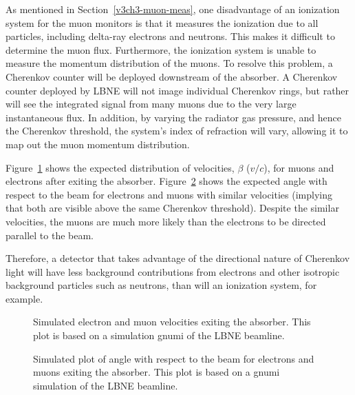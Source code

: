 As mentioned in Section~\ref{v3ch3-muon-meas}, one disadvantage of an ionization system for the
muon monitors is that it measures the ionization due to all
particles, including delta-ray electrons and neutrons. This makes it
difficult to determine the muon flux.  Furthermore, the ionization
system is unable to measure the momentum distribution of the
muons. To resolve this problem, a Cherenkov
counter will be deployed downstream of the absorber.  A Cherenkov counter deployed by LBNE
will not image individual Cherenkov rings, but rather will see the
integrated signal from many muons due to the very large instantaneous flux. 
In addition, by varying the radiator gas pressure, and hence the Cherenkov threshold, the system's index of refraction will vary, allowing it to map out the muon momentum distribution.


Figure~\ref{fig:MuonBeta} shows the expected distribution of
velocities, $\beta$ ($v/c$), for muons and electrons after exiting the
absorber. 
Figure~\ref{fig:MuonAngle} shows the expected angle with respect to the beam for
electrons and muons with similar velocities (implying that both are visible above the 
same Cherenkov threshold).  Despite the similar velocities, the muons are much more likely
than the electrons to be directed parallel to the beam.

Therefore, a detector that takes advantage of the directional nature of Cherenkov
light will have less background contributions from
electrons 
and other isotropic background particles such as neutrons, than will an ionization system, for example. 

\begin{figure}[htbp]
\begin{center}
\caption[Simulated electron and muon velocities upon exiting absorber]{Simulated electron and muon velocities 
exiting the absorber.
This plot is based on a 
simulation gnumi\cite{GNuMI} of the LBNE beamline.}
\label{fig:MuonBeta}
\end{center}
\end{figure}


\begin{figure}[htbp]
\begin{center}
\caption[Simulated electron and muon angles upon exiting absorber]{Simulated plot of angle with respect to the beam for 
electrons and muons exiting the absorber.
This plot is based on a gnumi simulation of the LBNE beamline.}
\label{fig:MuonAngle}
\end{center}
\end{figure}


